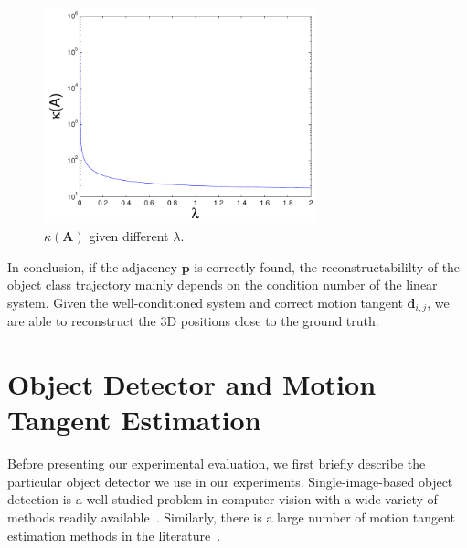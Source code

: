 \begin{figure}
\centering
\includegraphics[width=0.7\textwidth]{chapter4/resource/conditionNum_lamda.pdf}
\caption[Illustration of the system condition number given different weight $\lambda$.]{$\kappa(\mathbf{A})$ given different $\lambda$.}
\label{fig:conditionNum_lamda}
\end{figure}

In conclusion, if the adjacency $\mathbf{p}$ is correctly found, the reconstructabililty of the object class trajectory mainly depends on the condition number of the linear system. Given the well-conditioned system and correct motion tangent $\mathbf{d}_{i,j}$, we are able to reconstruct the 3D positions close to the ground truth.




\section{Object Detector and Motion Tangent Estimation}
\label{sec:face_detection}
Before presenting our experimental evaluation, we first briefly describe the particular object detector we use in our experiments.
Single-image-based object detection is a well studied problem in computer vision with a wide variety of methods readily available~\cite{Zhang2006Local,Dalal2005HOG,lsvm-pami}. Similarly, there is a large number of motion tangent estimation methods in the literature~\cite{Blanz2003face,Gu20063D,jain2010fddb,jones2003fast}.

